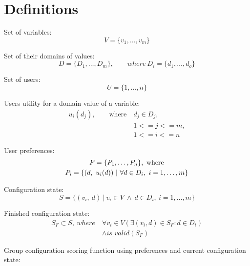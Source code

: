 \documentclass{article}
\begin{document}
\FloatBarrier

\section{Definitions}

Set of variables:
\begin{equation}
    V = \{v_1, \dotsc, v_m\}
\end{equation}

Set of their domains of values:
\begin{equation}
    D = \{D_1, \dotsc, D_m\}, \qquad where \ D_i = \{d_1, \dotsc, d_o\}
\end{equation}

Set of users:
\begin{equation}
    U = \{1, \dotsc, n\}
\end{equation}

Users utility for a domain value of a variable:
\begin{equation}
    \begin{split}
        u_i(d_j), \qquad \text{where}\ & d_j \in D_j,\\
        & 1 <= j <= m, \\
        & 1 <= i <= n
    \end{split}
\end{equation}

User preferences:
\begin{gather}
    P = \{ P_1, \dotsc, P_n\},\ \text{where} \\
    P_i = \{(d,\ u_i(d)) \ | \ \forall d \in D_i,\ i=1,\dotsc,m \} \notag
\end{gather}

Configuration state:
\begin{equation}
    S = \{ (v_i,\ d) \ |\ v_i \in V \ \land \ d \in D_i,\ i=1,\dotsc,m \}
\end{equation}

Finished configuration state:
\begin{equation}
\begin{split}
    S_F \subset S,\ where \  & \forall v_i \in V (\exists (v_i, d) \in S_F : d \in D_i) \\
    & \land is\_valid(S_F)
\end{split}
\end{equation}


Group configuration scoring function using preferences and current configuration state:
\end{document}

